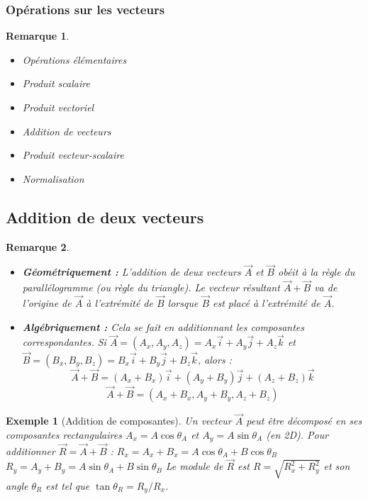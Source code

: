 \documentclass{article}
\newtheorem{remark}{Remarque}
\newtheorem{example}{Exemple}
\begin{document}
\subsubsection{Opérations sur les vecteurs}
\begin{remark}
\begin{itemize}
    \item Opérations élémentaires
    \item Produit scalaire
    \item Produit vectoriel
    \item Addition de vecteurs
    \item Produit vecteur-scalaire
    \item Normalisation
\end{itemize}
\end{remark}
\subsection{Addition de deux vecteurs}
\begin{remark}
\begin{itemize}
    \item \textbf{Géométriquement :} L'addition de deux vecteurs $\vec{A}$ et $\vec{B}$ obéit à la règle du parallélogramme (ou règle du triangle). Le vecteur résultant $\vec{A}+\vec{B}$ va de l'origine de $\vec{A}$ à l'extrémité de $\vec{B}$ lorsque $\vec{B}$ est placé à l'extrémité de $\vec{A}$.
    \item \textbf{Algébriquement :} Cela se fait en additionnant les composantes correspondantes. Si $\vec{A} = (A_x, A_y, A_z) = A_x\vec{i} + A_y\vec{j} + A_z\vec{k}$ et $\vec{B} = (B_x, B_y, B_z) = B_x\vec{i} + B_y\vec{j} + B_z\vec{k}$, alors :
    \[ \vec{A} + \vec{B} = (A_x + B_x)\vec{i} + (A_y + B_y)\vec{j} + (A_z + B_z)\vec{k} \]
    \[ \vec{A} + \vec{B} = (A_x + B_x, A_y + B_y, A_z + B_z) \]
\end{itemize}
\end{remark}
\begin{example}[Addition de composantes]
Un vecteur $\vec{A}$ peut être décomposé en ses composantes rectangulaires $A_x = A \cos \theta_A$ et $A_y = A \sin \theta_A$ (en 2D).
Pour additionner $\vec{R} = \vec{A} + \vec{B}$ :
$R_x = A_x + B_x = A \cos \theta_A + B \cos \theta_B$
$R_y = A_y + B_y = A \sin \theta_A + B \sin \theta_B$
Le module de $\vec{R}$ est $R = \sqrt{R_x^2 + R_y^2}$ et son angle $\theta_R$ est tel que $\tan \theta_R = R_y / R_x$.
\end{example}
\end{document}
